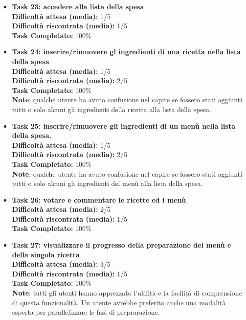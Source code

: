 \begin{itemize}
\item
\textbf{Task 23: accedere alla lista della spesa}\\
\textbf{Difficoltà attesa (media):} 1/5\\
\textbf{Difficoltà riscontrata (media):} 1/5\\
\textbf{Task Completato:} 100\%\\

\item
\textbf{Task 24: inserire/rimuovere gl ingredienti di una ricetta nella
lista della spesa}\\
\textbf{Difficoltà attesa (media):} 1/5\\
\textbf{Difficoltà riscontrata (media):} 2/5\\
\textbf{Task Completato:} 100\%\\
\textbf{Note}: qualche utente ha avuto confusione nel capire se fossero
stati aggiunti tutti o solo alcuni gli ingredienti della ricetta alla
lista della spesa.

\item
\textbf{Task 25: inserire/rimuovere gli ingredienti di un menù nella
lista della spesa.}\\
\textbf{Difficoltà attesa (media):} 1/5\\
\textbf{Difficoltà riscontrata (media):} 2/5\\
\textbf{Task Completato:} 100\%\\
\textbf{Note}: qualche utente ha avuto confusione nel capire se fossero
stati aggiunti tutti o solo alcuni gli ingredienti del menù alla lista
della spesa.

\item
\textbf{Task 26: votare e commentare le ricette ed i menù}\\
\textbf{Difficoltà attesa (media):} 2/5\\
\textbf{Difficoltà riscontrata (media):} 1/5\\
\textbf{Task Completato:} 100\%\\

\item
\textbf{Task 27: visualizzare il progresso della preparazione del menù e
della singola ricetta}\\
\textbf{Difficoltà attesa (media):} 3/5\\
\textbf{Difficoltà riscontrata (media):} 1/5\\
\textbf{Task Completato:} 100\%\\
\textbf{Note}: tutti gli utenti hanno apprezzato l'utilità e la facilità
di comprensione di questa funzionalità. Un utente avrebbe preferito
anche una modalità esperta per parallelizzare le fasi di preprarazione.


\end{itemize}
